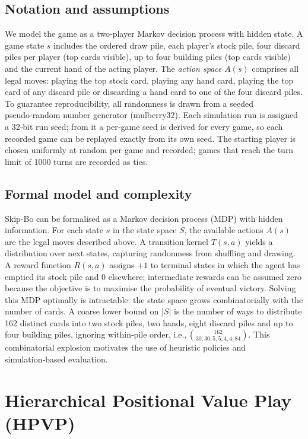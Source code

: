 \documentclass[11pt]{article}
\begin{document}
\subsection{Notation and assumptions}
We model the game as a two‑player Markov decision process with hidden state. A game state $s$ includes the ordered draw pile, each player’s stock pile, four discard piles per player (top cards visible), up to four building piles (top cards visible) and the current hand of the acting player. The \emph{action space} $A(s)$ comprises all legal moves: playing the top stock card, playing any hand card, playing the top card of any discard pile or discarding a hand card to one of the four discard piles. To guarantee reproducibility, all randomness is drawn from a seeded pseudo‑random number generator (mulberry32). Each simulation run is assigned a 32‑bit run seed; from it a per‑game seed is derived for every game, so each recorded game can be replayed exactly from its own seed. The starting player is chosen uniformly at random per game and recorded; games that reach the turn limit of 1000 turns are recorded as ties.

\subsection{Formal model and complexity}
Skip‑Bo can be formalised as a Markov decision process (MDP) with hidden information. For each state $s$ in the state space $S$, the available actions $A(s)$ are the legal moves described above. A transition kernel $T(s,a)$ yields a distribution over next states, capturing randomness from shuffling and drawing. A reward function $R(s,a)$ assigns $+1$ to terminal states in which the agent has emptied its stock pile and $0$ elsewhere; intermediate rewards can be assumed zero because the objective is to maximise the probability of eventual victory. Solving this MDP optimally is intractable: the state space grows combinatorially with the number of cards. A coarse lower bound on $|S|$ is the number of ways to distribute 162 distinct cards into two stock piles, two hands, eight discard piles and up to four building piles, ignoring within‑pile order, i.e.,\,\(\binom{162}{30,30,5,5,4,4,84}\). This combinatorial explosion motivates the use of heuristic policies and simulation‑based evaluation.

\section{Hierarchical Positional Value Play (HPVP)}
\end{document}
